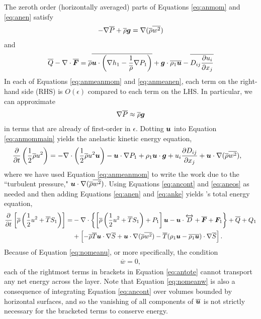 \documentclass[12pt]{article}
\newcommand{\vecf}{\bm{F}}
\begin{document}
  The zeroth order (horizontally averaged) parts of Equations \eqref{eq:anmom} and \eqref{eq:anen} satisfy 
  \begin{align}\label{eq:anmeanmom}
  	-\nabla\overline{P} + \overline{\rho}\bm{g} = \nabla(\overline{\rho} \overline{w^2})
  \end{align}
  and
  \begin{align}\label{eq:anmeanen}
  	\qref - \Div\overline{\vecf} = \rhoref\overline{\vecu\cdot\left(\nabla h_1-\frac{1}{\rhoref}\nabla P_1\right)} + \vecg\cdot\overline{\rho_1\vecu} - \overline{D_{ij}\pderiv{u_i}{x_j}}
  \end{align}
  In each of Equations \eqref{eq:anmeanmom} and \eqref{eq:anmeanen}, each term on the right-hand side (RHS) is $O(\epsilon)$ compared to each term on the LHS. In particular, we can approximate 
  \begin{align}\label{eq:anhydrostatic}
  	\nabla\overline{P}\approx \overline{\rho}\bm{g}
  \end{align}
  in terms that are already of first-order in $\epsilon$. Dotting $\bm{u}$ into Equation \eqref{eq:anmommain} yields the anelastic kinetic energy equation,
	\begin{align}\label{eq:anke}
		\frac{\partial}{\partial t}\left(\frac{1}{2}\overline{\rho} u^2\right)&=-\nabla\cdot\left(\frac{1}{2}\overline{\rho} u^2\bm{u} \right) - \bm{u}\cdot\nabla P_1 + \rho_1\bm{u}\cdot\bm{g} + u_i\frac{\partial D_{ij}}{\partial x_j} + \bm{u}\cdot\nabla(\overline{\rho} \overline{w^2}),
	\end{align}
where we have used Equation \eqref{eq:anmeanmom} to write the work due to the ``turbulent pressure," $\bm{u}\cdot\nabla (\overline{\rho} \overline{w^2})$. 
Using Equations \eqref{eq:ancont} and \eqref{eq:aneos} as needed and then adding Equations \eqref{eq:anen} and \eqref{eq:anke} yields \citet{Gough1969}'s total energy equation,
\begin{align}\label{eq:antote}
			\pderiv{}{t}\left[\rhoref\left(\frac{1}{2} u^2 + \tmpref S_1\right)\right] = &-\Div\left\{\left[\rhoref\left(\frac{1}{2} u^2 + \tmpref S_1\right) + P_1\right]\vecu- \vecu\cdot\overleftrightarrow{D} + \overline{\vecf} + \vecf_1\right\}+ \qref + Q_1 \nonumber\\
			 &+\left[-\rhoref\tmpref\ugrad\sref +\ugrad (\rhoref \overline{w^2})- \tmpref(\rho_1\vecu-\overline{\rho_1\vecu})\cdot\nabla\sref\right].
\end{align}
Because of Equation \eqref{eq:nomeanu}, or more specifically, the condition
\begin{align}\label{eq:nomeanw}
	\overline{w}=0,
\end{align}
 each of the rightmost terms in brackets in Equation \eqref{eq:antote} cannot transport any net energy across the layer. Note that Equation \eqref{eq:nomeanw} is also a consequence of integrating Equation \eqref{eq:ancont} over volumes bounded by horizontal surfaces, and so the vanishing of all components of $\overline{\bm{u}}$ is not strictly necessary for the bracketed terms to conserve energy. 
 
\end{document}

